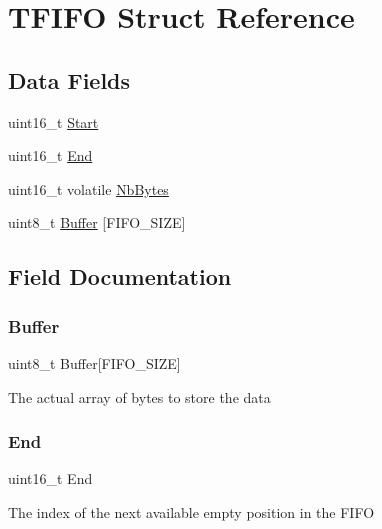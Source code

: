 \hypertarget{struct_t_f_i_f_o}{}\section{T\+F\+I\+FO Struct Reference}
\label{struct_t_f_i_f_o}
\subsection*{Data Fields}
\begin{DoxyCompactItemize}
\item 
uint16\+\_\+t \hyperlink{struct_t_f_i_f_o_a4f967ca491e9a73c29bc50bc9ff53b68}{Start}
\item 
uint16\+\_\+t \hyperlink{struct_t_f_i_f_o_a264dd0a948b0ef315fc096e567937ec2}{End}
\item 
uint16\+\_\+t volatile \hyperlink{struct_t_f_i_f_o_a019eff7466efebc8e97b70cc263b54af}{Nb\+Bytes}
\item 
uint8\+\_\+t \hyperlink{struct_t_f_i_f_o_ab95bb331b703208d9a7d67d623b0d9ef}{Buffer} \mbox{[}F\+I\+F\+O\+\_\+\+S\+I\+ZE\mbox{]}
\end{DoxyCompactItemize}


\subsection{Field Documentation}
\mbox{\label{struct_t_f_i_f_o_ab95bb331b703208d9a7d67d623b0d9ef}} 
\subsubsection{\texorpdfstring{Buffer}{Buffer}}
{\footnotesize\ttfamily uint8\+\_\+t Buffer\mbox{[}F\+I\+F\+O\+\_\+\+S\+I\+ZE\mbox{]}}

The actual array of bytes to store the data \mbox{\label{struct_t_f_i_f_o_a264dd0a948b0ef315fc096e567937ec2}} 
\subsubsection{\texorpdfstring{End}{End}}
{\footnotesize\ttfamily uint16\+\_\+t End}

The index of the next available empty position in the F\+I\+FO \mbox{\label{struct_t_f_i_f_o_a019eff7466efebc8e97b70cc263b54af}} 

